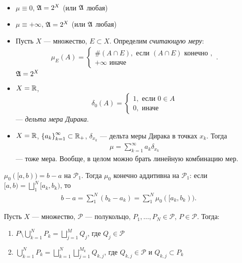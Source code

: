\begin{exmpl}\
 \begin{itemize}
  \item $ \mu \equiv 0 $, $ \mathfrak{A} = 2^X $ (или $ \mathfrak{A} $ любая) 
  \item $ \mu \equiv +\infty $, $ \mathfrak{A} = 2^X $ (или $ \mathfrak{A} $ любая) 
  \item Пусть $ X $ --- множество, $ E \subset X $. Определим \textit{считающую меру}:
   \begin{align*}
    \mu_E(A) =
    \begin{cases}
     \#(A \cap E), \text{ если  } (A \cap E) \text { конечно }, \\
     +\infty \text { иначе }
    \end{cases}
   .\end{align*} $ \mathfrak{A} = 2^X $
  \item $ X = \mathbb{R} $, $$ \delta_0(A) =
   \begin{cases}
    1, \text{ если } 0 \in A \\
    0, \text { иначе }
   \end{cases}$$ --- \textit{дельта мера Дирака}.
  \item $ X = \mathbb{R} $, $  \left\{ a_k \right\}_{k=1}^\infty \subset \mathbb{R}_+ $, $ \delta_{x_k} $ --- дельта меры Дирака в точках $ x_k $. Тогда
   \begin{align*}
    \mu = \sum_{k=1}^\infty a_k \delta_{x_k}
   \end{align*} --- тоже мера. Вообще, в целом можно брать линейную комбинацию мер.
 \end{itemize}
\end{exmpl}
\begin{exmpl}
 $ \mu_0([a, b)) = b - a $ на $ \mathcal{P}_1 $. Тогда $ \mu_0 $ конечно аддитивна на $ \mathcal{P}_1 $: если $ [a, b)  = \bigsqcup_1^N [a_k, b_k) $, то
 \begin{align*}
  b - a = \sum_1^N (b_k - a_k) = \sum_1^N \mu_0([a_k, b_k))
 .\end{align*}
\end{exmpl}
\begin{lm}
 Пусть $ X $ --- множество, $ \mathcal{P} $ --- полукольцо, $ P_1, \ldots, P_N \in \mathcal{P} $, $ P \in \mathcal{P} $. Тогда:
 \begin{enumerate}
  \item $ \displaystyle P \setminus \bigcup_{k=1}^N P_k = \bigsqcup_{j=1}^M Q_j $, где $ Q_j \in \mathcal{P} $
  \item $ \displaystyle \bigcup_{k=1}^N P_k = \bigsqcup_{k=1}^N \bigsqcup_{j=1}^{M_k} Q_{k,j} $, где $ Q_{k,j} \in \mathcal{P} $ и $ Q_{k,j} \subset P_k $
 \end{enumerate} 
\end{lm}
